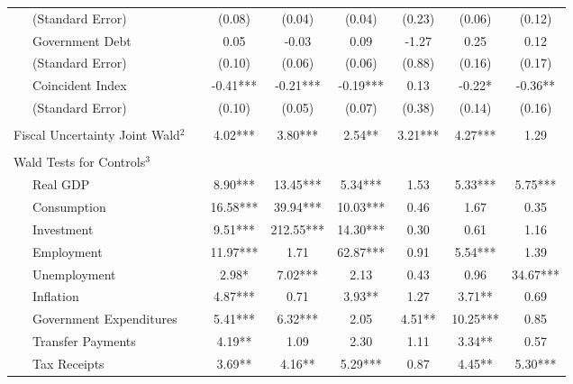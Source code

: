 \begin{table}
{\begin{center}
\begin{tabular}{l|S[table-format=3.2] S[table-format=3.2] S[table-format=3.2] S[table-format=3.2] S[table-format=3.2] S[table-format=3.2]}
~~~(Standard Error) & (0.08) & (0.04) & (0.04) & (0.23) & (0.06) & (0.12) \\ [0.2pc]
~~~Government Debt & 0.05 & -0.03 & 0.09 & -1.27 & 0.25 & 0.12 \\
~~~(Standard Error) & (0.10) & (0.06) & (0.06) & (0.88) & (0.16) & (0.17) \\ [0.2pc]
~~~Coincident Index & -0.41*** & -0.21*** & -0.19*** & 0.13 & -0.22* & -0.36** \\
~~~(Standard Error) & (0.10) & (0.05) & (0.07) & (0.38) & (0.14) & (0.16) \\ [0.2pc]
\hline
 &  \\ [-0.25pc]
Fiscal Uncertainty Joint Wald$^2$~~ & 4.02*** & 3.80*** & 2.54** & 3.21*** & 4.27*** & 1.29 \\ [0.5pc] \hline
 &  \\ [-0.25pc]
Wald Tests for Controls$^3$ &  \\ [0.5pc]
~~~Real GDP & 8.90*** & 13.45*** & 5.34*** & 1.53 & 5.33*** & 5.75*** \\
~~~Consumption & 16.58*** & 39.94*** & 10.03*** & 0.46 & 1.67 & 0.35 \\
~~~Investment & 9.51*** & 212.55*** & 14.30*** & 0.30 & 0.61 & 1.16 \\
~~~Employment & 11.97*** & 1.71 & 62.87*** & 0.91 & 5.54*** & 1.39 \\
~~~Unemployment & 2.98* & 7.02*** & 2.13 & 0.43 & 0.96 & 34.67*** \\
~~~Inflation & 4.87*** & 0.71 & 3.93** & 1.27 & 3.71** & 0.69 \\
~~~Government Expenditures & 5.41*** & 6.32*** & 2.05 & 4.51** & 10.25*** & 0.85 \\
~~~Transfer Payments & 4.19** & 1.09 & 2.30 & 1.11 & 3.34** & 0.57 \\
~~~Tax Receipts & 3.69** & 4.16** & 5.29*** & 0.87 & 4.45** & 5.30*** \\



\end{tabular}
\end{center}}
\end{table}
